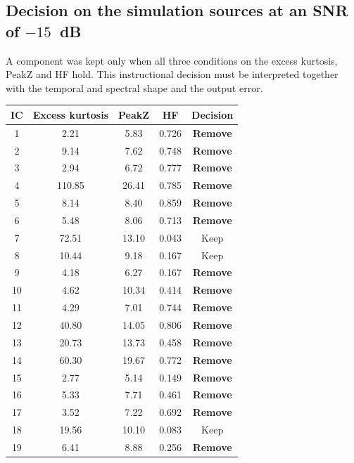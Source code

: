 \subsection*{Decision on the simulation sources at an SNR of $-15$~dB}
A component was kept only when all three conditions on the excess kurtosis, PeakZ and HF hold. This instructional decision must be interpreted together with the temporal and spectral shape and the output error.
\begin{center}
\small
\begin{longtable}{@{}ccccc@{}}
\toprule
\textbf{IC} & \textbf{Excess kurtosis} & \textbf{PeakZ} & \textbf{HF} & \textbf{Decision}\\
\midrule
\endhead
1 & 2.21 & 5.83 & 0.726 & \textcolor{accent}{\textbf{Remove}}\\
2 & 9.14 & 7.62 & 0.748 & \textcolor{accent}{\textbf{Remove}}\\
3 & 2.94 & 6.72 & 0.777 & \textcolor{accent}{\textbf{Remove}}\\
4 & 110.85 & 26.41 & 0.785 & \textcolor{accent}{\textbf{Remove}}\\
5 & 8.14 & 8.40 & 0.859 & \textcolor{accent}{\textbf{Remove}}\\
6 & 5.48 & 8.06 & 0.713 & \textcolor{accent}{\textbf{Remove}}\\
7 & 72.51 & 13.10 & 0.043 & Keep\\
8 & 10.44 & 9.18 & 0.167 & Keep\\
9 & 4.18 & 6.27 & 0.167 & \textcolor{accent}{\textbf{Remove}}\\
10 & 4.62 & 10.34 & 0.414 & \textcolor{accent}{\textbf{Remove}}\\
11 & 4.29 & 7.01 & 0.744 & \textcolor{accent}{\textbf{Remove}}\\
12 & 40.80 & 14.05 & 0.806 & \textcolor{accent}{\textbf{Remove}}\\
13 & 20.73 & 13.73 & 0.458 & \textcolor{accent}{\textbf{Remove}}\\
14 & 60.30 & 19.67 & 0.772 & \textcolor{accent}{\textbf{Remove}}\\
15 & 2.77 & 5.14 & 0.149 & \textcolor{accent}{\textbf{Remove}}\\
16 & 5.33 & 7.71 & 0.461 & \textcolor{accent}{\textbf{Remove}}\\
17 & 3.52 & 7.22 & 0.692 & \textcolor{accent}{\textbf{Remove}}\\
18 & 19.56 & 10.10 & 0.083 & Keep\\
19 & 6.41 & 8.88 & 0.256 & \textcolor{accent}{\textbf{Remove}}\\

\end{longtable}
\end{center}
